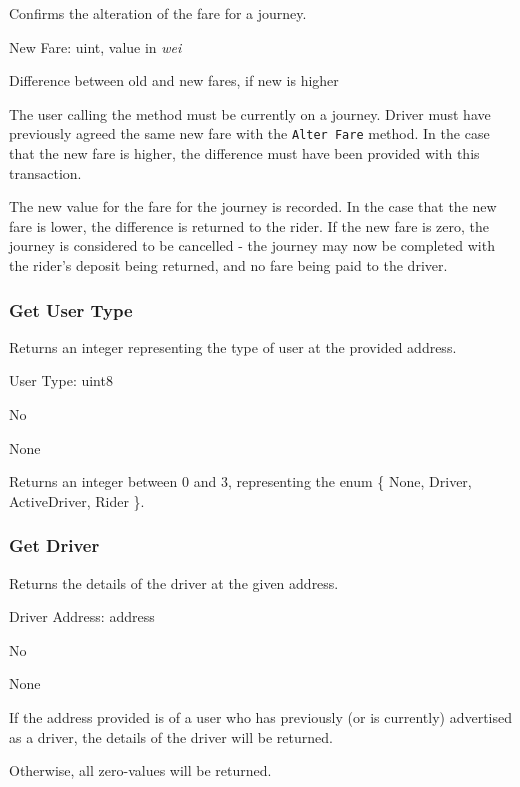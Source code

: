 \begin{description}[leftmargin=8em,style=nextline]
	\item [Description]
		Confirms the alteration of the fare for a journey.
	\item [Arguments]
		New Fare: uint, value in \textit{wei}
	\item [Payable]
		Difference between old and new fares, if new is higher
	\item [Preconditions]
		The user calling the method must be currently on a journey. Driver must have previously agreed the same new fare with the \lstinline{Alter Fare} method. In the case that the new fare is higher, the difference must have been provided with this transaction.
	\item [Postconditions]
		The new value for the fare for the journey is recorded. In the case that the new fare is lower, the difference is returned to the rider. If the new fare is zero, the journey is considered to be cancelled - the journey may now be completed with the rider's deposit being returned, and no fare being paid to the driver.
\end{description}

\subsubsection{Get User Type}

\begin{description}[leftmargin=8em,style=nextline]
	\item [Description]
		Returns an integer representing the type of user at the provided address.
	\item [Arguments]
		User Type: uint8
	\item [Payable]
		No
	\item [Preconditions]
		None
	\item [Postconditions]
		Returns an integer between 0 and 3, representing the enum \{ None, Driver, ActiveDriver, Rider \}.
\end{description}

\subsubsection{Get Driver}

\begin{description}[leftmargin=8em,style=nextline]
	\item [Description]
		Returns the details of the driver at the given address.
	\item [Arguments]
		Driver Address: address
	\item [Payable]
		No
	\item [Preconditions]
		None
	\item [Postconditions]
		If the address provided is of a user who has previously (or is currently) advertised as a driver, the details of the driver will be returned.
		
		Otherwise, all zero-values will be returned.
\end{description}

